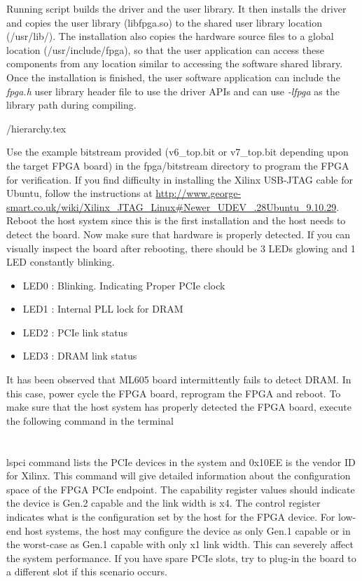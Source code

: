 Running script builds the driver and the user library. 
It then installs the driver and copies the user library (libfpga.so) to the shared user library location (/usr/lib/).
The installation also copies the hardware source files to a global location (/usr/include/fpga), so that the user application can access these components from any location similar to accessing the software shared library.
Once the installation is finished, the user software application can include the \emph{fpga.h} user library header file to use the driver APIs and can use \emph{-lfpga} as the library path during compiling.

 \TBLDIR/hierarchy.tex

Use the example bitstream provided (v6\_top.bit or v7\_top.bit depending upon the target FPGA board) in the fpga/bitstream directory to program the FPGA for verification.
If you find difficulty in installing the Xilinx USB-JTAG cable for Ubuntu, follow the instructions at \url{http://www.george-smart.co.uk/wiki/Xilinx_JTAG_Linux#Newer_UDEV_.28Ubuntu_9.10.29}.
Reboot the host system since this is the first installation and the host needs to detect the board.
Now make sure that hardware is properly detected.
If you can visually inspect the board after rebooting, there should be 3 LEDs glowing and 1 LED constantly blinking.
\begin{itemize}
\item{LED0 : Blinking. Indicating Proper PCIe clock}
\item{LED1 : Internal PLL lock for DRAM}
\item{LED2 : PCIe link status}
\item{LED3 : DRAM link status}
\end{itemize}
It has been observed that ML605 board intermittently fails to detect DRAM.
In this case, power cycle the FPGA board, reprogram the FPGA and reboot.
To make sure that the host system has properly detected the FPGA board, execute the following command in the terminal\\
\\\\
lspci command lists the PCIe devices in the system and 0x10EE is the vendor ID for Xilinx.
This command will give detailed information about the configuration space of the FPGA PCIe endpoint.
The capability register values should indicate the device is Gen.2 capable and the link width is x4.
The control register indicates what is the configuration set by the host for the FPGA device.
For low-end host systems, the host may configure the device as only Gen.1 capable or in the worst-case as Gen.1 capable with only x1 link width.
This can severely affect the system performance.
If you have spare PCIe slots, try to plug-in the board to a different slot if this scenario occurs.

